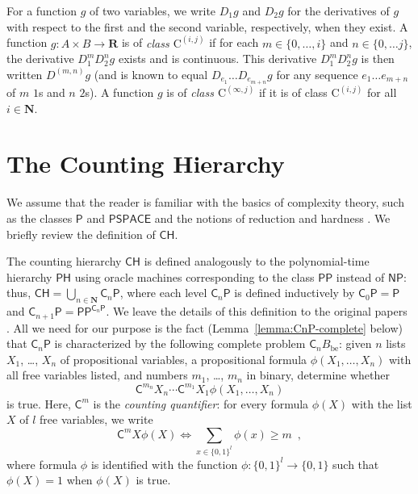 \documentclass[12pt,a4paper]{article}
\theoremstyle{definition}
\theoremstyle{remark}
\newcommand{\R}{\mathbf R}
\newcommand{\N}{\mathbf N}
\newcommand{\D}{D}
\newcommand{\classP}{\mathsf{P}}
\newcommand{\classPSPACE}{\mathsf{PSPACE}}
\newcommand{\classNP}{\mathsf{NP}}
\newcommand{\classPH}{\mathsf{PH}}
\newcommand{\classPP}{\mathsf{PP}}
\newcommand{\classCH}{\mathsf{CH}}
\newcommand{\quantC}{\mathsf{C}}
\newcommand{\classC}{\mathrm C}
\begin{document}
For a function $g$ of two variables, 
we write $\D _1 g$ and $\D _2 g$ for the derivatives of $g$ 
with respect to the first and the second variable,
respectively, 
when they exist.
A function $g \colon A \times B \to \R$ is of \emph{class $\classC^{(i, j)}$}
if for each $m \in \{0, \dots, i\}$ and $n \in \{0, \dots j\}$,
the derivative $\D_1^m \D_2^n g$ exists and is continuous.
This derivative $\D_1^m \D_2^n g$ is then written $\D ^{(m, n)} g$
(and is known to equal $\D _{e_1} \ldots \D _{e _{m + n}} g$ for any 
sequence $e _1 \ldots e _{m + n}$ of $m$ $1$s and $n$ $2$s). 
A function $g$ is of \emph{class $\classC^{(\infty, j)}$}
if it is of class $\classC^{(i, j)}$ for all $i \in \N$.

\section{The Counting Hierarchy}
\label{section: counting hierarchy}

We assume that the reader is familiar with 
the basics of complexity theory, 
such as the classes $\classP$ and $\classPSPACE$
and the notions of reduction and hardness 
\cite{wegener-book}. 
We brief\textcompwordmark ly review the definition of $\classCH$. 

The counting hierarchy $\classCH$ is defined analogously to 
the polynomial-time hierarchy $\classPH$ \cite[\S 10.4]{wegener-book} using 
oracle machines corresponding to the class $\classPP$ \cite[\S 3.3]{wegener-book}
instead of $\classNP$: 
thus, $\classCH = \bigcup _{n \in \N} \quantC _n \classP$, 
where each level $\quantC _n \classP$ is defined inductively by $
 \quantC_0 \classP  = \classP 
$ and $
 \quantC_{n+1} \classP = \classPP^{\quantC_n \classP}
$. 
We leave the details of this definition to 
the original papers~%
\cite{wagner1986complexity,toran1991complexity}. 
All we need for our purpose is the fact (Lemma~\ref{lemma:CnP-complete} below) 
that $\quantC _n \classP$ 
is characterized by the following complete problem $\quantC_n B_{\mathrm{be}}$:
given $n$ lists $X _1$, \ldots, $X _n$ of propositional variables, 
a propositional formula $\phi (X _1, \dots, X _n)$ with all free variables listed, 
and numbers $m _1$, \ldots, $m _n$ in binary, 
determine whether 
\begin{equation}
 \quantC^{m_n}{X_n} \cdots \quantC^{m_1}{X_1} \phi(X_1, \dots, X_n)
\end{equation}
is true.  Here, $\quantC ^m$ is the \emph{counting quantifier}: 
for every formula $\phi(X)$ with the list $X$ of $l$ free variables,
we write 
\begin{equation}
 \quantC^m X \phi(X) 
  \iff 
  \sum_{x \in \{0,1\}^l} \phi(x) \ge m \enspace ,
\end{equation}
where formula $\phi$ is identified with the function 
$\phi \colon \{0,1\}^l \to \{0,1\}$
such that $\phi(X) = 1$ when $\phi(X)$ is true.
\end{document}
